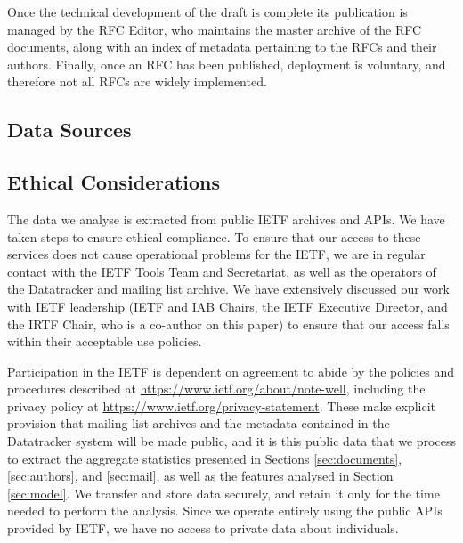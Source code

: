 \documentclass[twocolumn,10pt]{article}
\begin{document}
Once the technical development of the draft is complete its publication is
managed by the RFC Editor, who maintains the master archive of the RFC
documents, along with an index of metadata pertaining to the RFCs and their
authors. Finally, once an RFC has been published, deployment is voluntary,
and therefore not all RFCs are widely implemented.

\subsection{Data Sources}


\subsection{Ethical Considerations}
\label{sec:ethics}


The data we analyse is extracted from public IETF archives and APIs.  We
have taken steps to ensure ethical compliance.  To ensure that our access
to these services does not cause operational problems for the IETF, we are
in regular contact with the IETF Tools Team and Secretariat, as well as the
operators of the Datatracker and mailing list archive.  We have extensively
discussed our work with IETF leadership (IETF and IAB Chairs, the IETF
Executive Director, and the IRTF Chair, who is a co-author on this paper)
to ensure that our access falls within their acceptable use policies.

Participation in the IETF is dependent on agreement to abide by the
policies and procedures described at \url{https://www.ietf.org/about/note-well},
including the privacy policy at \url{https://www.ietf.org/privacy-statement}.
These make explicit provision that mailing list archives and the metadata
contained in the Datatracker system will be made public, and it is this
public data that we process to extract the aggregate statistics presented
in Sections \ref{sec:documents}, \ref{sec:authors}, and \ref{sec:mail}, as
well as the features analysed in Section \ref{sec:model}. We transfer and
store data securely, and retain it only for the time needed to perform the
analysis.  Since we operate entirely using the public APIs provided by
IETF, we have no access to private data about individuals.
\end{document}

